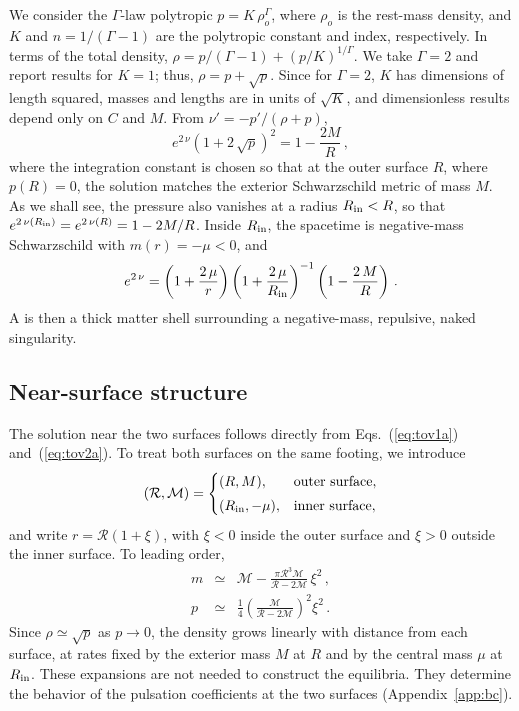 \documentclass[%
 reprint,
 amsmath,amssymb,
 aps,prd,
 superscriptaddress,
]{revtex4-2}
\begin{document}
We consider the $\Gamma$-law polytropic \eos{} $p = K\,\rho_o^\Gamma$, where $\rho_o$ is the rest-mass density, and $K$ and $n = 1/(\Gamma-1)$ are the polytropic constant and index, respectively. In terms of the total density, $\rho = p/(\Gamma-1)+ (p/K)^{1/\Gamma}$. We take $\Gamma = 2$ and report results for $K=1$; thus, $\rho = p+ \sqrt{p}$. Since for $\Gamma = 2$, $K$ has dimensions of length squared, masses and lengths are in units of $\sqrt{K}$, and dimensionless results depend only on $C$ and $M$. From $\nu'=-p'/(\rho+p)$,
\begin{equation}
e^{2\,\nu}(1+2\,\sqrt{p})^2 = 1-\frac{2M}{R}\,,
\label{eq:firstint}
\end{equation}
where the integration constant is chosen so that at the outer surface $R$, where $p(R) = 0$, the solution matches the exterior Schwarzschild metric of mass $M$. As we shall see, the pressure also vanishes at a radius $R_{\rm in} < R$, so that $e^{2\,\nu(R_{\rm in})}= e^{2\,\nu(R)} = 1-2M/R$. Inside $R_{\rm in}$, the spacetime is negative-mass Schwarzschild with $m(r) = -\mu < 0$, and
\begin{equation}
    e^{2\,\nu}= \left(1+\frac{2\,\mu}{r}\right)\left(1+\frac{2\,\mu}{R_{\rm in}}\right)^{-1}\left( 1-\frac{2\,M}{R}\right)\,.
\end{equation}
A \singu{} is then a thick matter shell surrounding a negative-mass, repulsive, naked singularity.

\subsection{Near-surface structure}

The solution near the two surfaces follows directly from Eqs.~(\ref{eq:tov1a}) and~(\ref{eq:tov2a}). To treat both surfaces on the same footing, we introduce
\begin{equation}
(\mathcal{R},\mathcal{M}) =
\begin{cases}
(R,M), & \text{outer surface},\\[1mm]
(R_{\rm in},-\mu), & \text{inner surface},
\end{cases}
\end{equation}
and write $r=\mathcal{R}(1+\xi)$, with $\xi<0$ inside the outer surface and $\xi>0$ outside the inner surface. To leading order,
\begin{eqnarray}
m &\simeq& \mathcal{M}-\frac{\pi \mathcal{R}^3 \mathcal{M}}{\mathcal{R}-2\mathcal{M}}\,\xi^2\,, \\
p &\simeq& \frac{1}{4}\left(\frac{\mathcal{M}}{\mathcal{R}-2\mathcal{M}}\right)^2\xi^2\,.
\end{eqnarray}
Since $\rho\simeq\sqrt{p}$ as $p\to0$, the density grows linearly with distance from each surface, at rates fixed by the exterior mass $M$ at $R$ and by the central mass $\mu$ at $R_{\rm in}$. These expansions are not needed to construct the equilibria. They determine the behavior of the pulsation coefficients at the two surfaces (Appendix~\ref{app:bc}).
\end{document}
